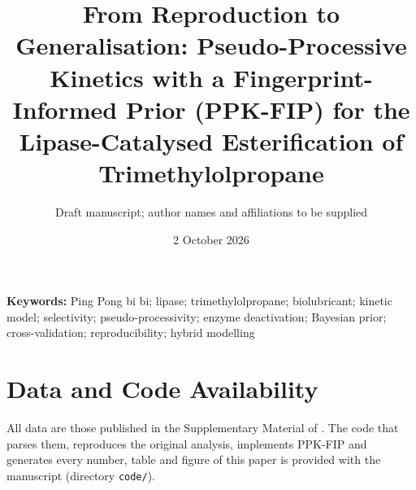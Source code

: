 \documentclass[10pt]{article}
\title{From Reproduction to Generalisation: Pseudo-Processive Kinetics with a Fingerprint-Informed Prior (PPK-FIP) for the Lipase-Catalysed Esterification of Trimethylolpropane}
\author{Draft manuscript; author names and affiliations to be supplied}
\date{2 October 2026}
\begin{document}
\maketitle
\begin{abstract}\end{abstract}
\noindent\textbf{Keywords:} Ping Pong bi bi; lipase; trimethylolpropane; biolubricant; kinetic model; selectivity; pseudo-processivity; enzyme deactivation; Bayesian prior; cross-validation; reproducibility; hybrid modelling





\section*{Data and Code Availability}
All data are those published in the Supplementary Material of \cite{nishimura2026}. The code that parses them, reproduces the original analysis, implements PPK-FIP and generates every number, table and figure of this paper is provided with the manuscript (directory \texttt{code/}).


\end{document}
